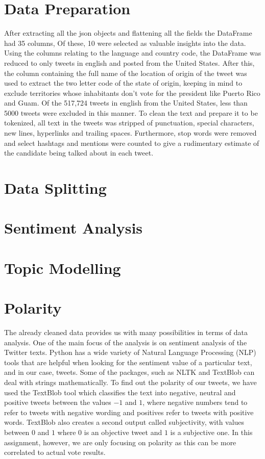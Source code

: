 \documentclass{article}
\begin{document}
  \tableofcontents
  \thispagestyle{empty}
  \pagebreak
  \setcounter{page}{1}
  \setcounter{section}{0}
  \section{Data Preparation}
  After extracting all the json objects and flattening all the fields
  the DataFrame had 35 columns, Of these, 10 were selected as valuable
  insights into the data.\\
  
  Using the columns relating to the language and country code, the
  DataFrame was reduced to only tweets in english and posted from the
  United States. After this, the column containing the full name of
  the location of origin of the tweet was used to extract the two
  letter code of the state of origin, keeping in mind to exclude
  territories whose inhabitants don’t vote for the president like
  Puerto Rico and Guam. Of the 517,724 tweets in english from the
  United States, less than 5000 tweets were excluded in this
  manner. To clean the text and prepare it to be tokenized, all text
  in the tweets was stripped of punctuation, special characters, new
  lines, hyperlinks and trailing spaces. Furthermore, stop words were
  removed and select hashtags and mentions were counted to give a
  rudimentary estimate of the candidate being talked about in each
  tweet.
  
  \section{Data Splitting}
  \section{Sentiment Analysis}
  \section{Topic Modelling}
  \section{Polarity}
  The already cleaned data provides us with many possibilities in
  terms of data analysis. One of the main focus of the analysis is on
  sentiment analysis of the Twitter texts. Python has a wide variety
  of Natural Language Processing (NLP) tools that are helpful when
  looking for the sentiment value of a particular text, and in our
  case, tweets. Some of the packages, such as NLTK and TextBlob can
  deal with strings mathematically. To find out the polarity of our
  tweets, we have used the TextBlob tool which classifies the text
  into negative, neutral and positive tweets between the values $-1$ and
  $1$, where negative numbers tend to refer to tweets with negative
  wording and positives refer to tweets with positive words. TextBlob
  also creates a second output called subjectivity, with values
  between $0$ and $1$  where $0$ is an objective tweet and $1$ is a subjective
  one. In this assignment, however, we are only focusing on polarity
  as this can be more correlated to actual vote results.%
\end{document}

